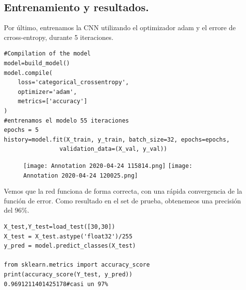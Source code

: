 \documentclass[a4paper,10pt]{article}
\begin{document}
\subsection{Entrenamiento y resultados.}
Por último, entrenamos la CNN utilizando el optimizador adam y el errore de crross-entropy, durante 5 iteraciones.
\begin{lstlisting}
#Compilation of the model
model=build_model()
model.compile(
    loss='categorical_crossentropy', 
    optimizer='adam', 
    metrics=['accuracy']
)
#entrenamos el modelo 55 iteraciones
epochs = 5
history=model.fit(X_train, y_train, batch_size=32, epochs=epochs,
				validation_data=(X_val, y_val))
\end{lstlisting}
\begin{figure}[H]
\centering
\texttt{[image: Annotation 2020-04-24 115814.png]}\hfill
\texttt{[image: Annotation 2020-04-24 120025.png]}
\end{figure}

\noindent
Vemos que la red funciona de forma correcta, con una rápida convergencia de la función de error. Como resultado en el set de prueba, obtenemeos una precisión del 96\%.

\begin{lstlisting}
X_test,Y_test=load_test([30,30])
X_test = X_test.astype('float32')/255 
y_pred = model.predict_classes(X_test)

from sklearn.metrics import accuracy_score
print(accuracy_score(Y_test, y_pred))
0.9691211401425178#casi un 97%
\end{lstlisting}
\end{document}
